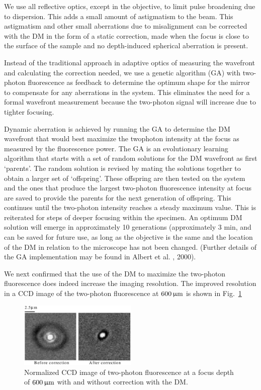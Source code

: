 We use all reflective optics, except in the objective, to limit pulse broadening due to dispersion. This adds a small amount of astigmatism to the beam. This astigmatism and other small aberrations due to misalignment can be corrected with the DM in the form of a static correction, made when the focus is close to the surface of the sample and no depth-induced spherical aberration is present.

Instead of the traditional approach in adaptive optics of measuring the wavefront and calculating the correction needed, we use a genetic algorithm (GA) with two-photon fluorescence as feedback to determine the optimum shape for the mirror to compensate for any aberrations in the system. This eliminates the need for a formal wavefront measurement because the two-photon signal will increase due to tighter focusing.

Dynamic aberration is achieved by running the GA to determine the DM wavefront that would best maximize the twophoton intensity at the focus as measured by the fluorescence power. The GA is an evolutionary learning algorithm that starts with a set of random solutions for the DM wavefront as first ‘parents’. The random solution is revised by mating the solutions together to obtain a larger set of ‘offspring’. These offspring are then tested on the system and the ones that produce the largest two-photon fluorescence intensity at focus are saved to provide the parents for the next generation of offspring. This continues until the two-photon intensity reaches a steady maximum value. This is reiterated for steps of deeper focusing within the specimen. An optimum DM solution will emerge in approximately 10 generations (approximately 3 min, and can be saved for future use, as long as the objective is the same and the location of the DM in relation to the microscope has not been changed. (Further details of the GA implementation may be found in Albert et al. , 2000).


We next confirmed that the use of the DM to maximize the two-photon fluorescence does indeed increase the imaging resolution. The improved resolution in a CCD image of the two-photon fluorescence at $\unit[600]{\upmu m}$ is shown in Fig.~\ref{fig:genetic_TPFM_correction}

\begin{figure}
	\centering
		\includegraphics[width=0.50\textwidth]{images/genetic_TPFM_correction}
	\caption{Normalized CCD image of two-photon fluorescence at a focus depth of $\unit[600]{\upmu m}$ with and without correction with the DM. \cite{Genetic_MPFM}}
	\label{fig:genetic_TPFM_correction}
\end{figure}



